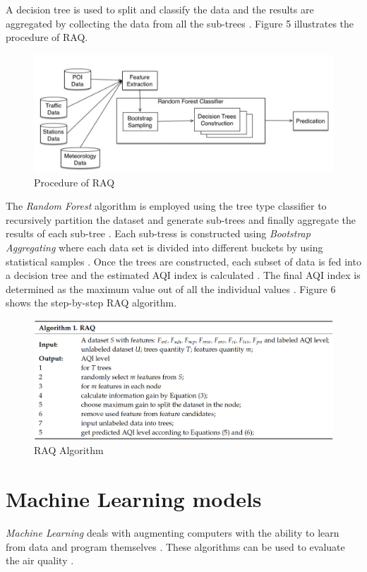 \documentclass[sigconf]{acmart}
\begin{document}
A decision tree is used to split and classify the data and the results are aggregated by collecting the data from all the sub-trees \cite{raq2016}. Figure 5 illustrates the procedure of RAQ.

\begin{figure}
\includegraphics[width=1.0\textwidth]{images/fig5.png}
\caption{Procedure of RAQ \cite{raq2016}}
\end{figure}

The {\em Random Forest} algorithm is employed using the tree type classifier to recursively partition the dataset and generate sub-trees and finally aggregate the results of each sub-tree \cite{raq2016}. Each sub-tress is constructed using {\em Bootstrap Aggregating} where each data set is divided into different buckets by using statistical samples \cite{raq2016}. Once the trees are constructed, each subset of data is fed into a decision tree and the estimated AQI index is calculated \cite{raq2016}. The final AQI index is determined as the maximum value out of all the individual values \cite{raq2016}. Figure 6 shows the step-by-step RAQ algorithm.

\begin{figure}
\includegraphics[width=1.0\textwidth]{images/fig6.png}
\caption{RAQ Algorithm \cite{raq2016}}
\end{figure}

\section{Machine Learning models}
{\em Machine Learning} deals with augmenting computers with the ability to learn from data and program themselves \cite{gagan2017}. These algorithms can be used to evaluate the air quality \cite{gagan2017}. 
\end{document}
